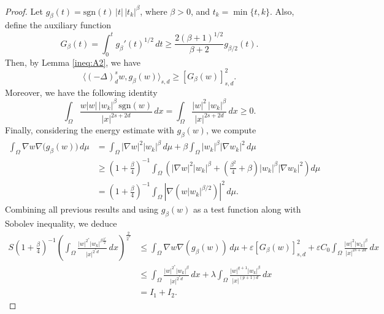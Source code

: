 \documentclass[10pt,a4paper]{amsart}
\begin{document}
\begin{proof}
Let $g_\beta(t) = \text{sgn}(t)\,|t|\,|t_k|^\beta$, where $\beta > 0$,  and $t_k = \min\{t, k\}$. Also, define the auxiliary function
\begin{equation*}
G_\beta(t) = \int_0^t g_\beta'(t)^{1/2} \, dt \geq \frac{2(\beta + 1)^{1/2}}{\beta + 2} g_{\beta/2}(t).
\end{equation*}
Then, by Lemma \ref{ineq:A2}, we have
\begin{equation*}
\langle (-\Delta)^s_d w, g_\beta(w) \rangle_{s,d} \geq \left[ G_\beta(w) \right]_{s,d}^2.
\end{equation*}
Moreover, we have the following identity
\begin{equation*}
\int_\Omega \frac{w |w|\, |w_k|^\beta \, \text{sgn}(w)}{|x|^{2s + 2 d}}\, dx = \int_\Omega \frac{|w|^2\, |w_k|^\beta}{|x|^{2s + 2 d}}\, dx \geq 0.
\end{equation*}
Finally, considering the energy estimate with \( g_\beta(w) \), we compute
\begin{equation*}
\begin{aligned}
\int_\Omega \nabla w  \nabla \big( g_\beta(w) \big)\, d\mu 
&= \int_\Omega |\nabla w|^2 |w_k|^\beta\, d\mu + \beta \int_\Omega |w_k|^\beta |\nabla w_k|^2 \, d\mu \\
&\geq \left(1 + \frac{\beta}{4}\right)^{-1} \int_\Omega \left( |\nabla w|^2 |w_k|^\beta + \left( \frac{\beta^2}{4} + \beta \right) |w_k|^\beta |\nabla w_k|^2 \right) d\mu \\
&= \left(1 + \frac{\beta}{4} \right)^{-1} \int_\Omega |\nabla (w |w_k|^{\beta/2})|^2\, d\mu.
\end{aligned}
\end{equation*}
Combining all previous results and using \( g_\beta(w) \) as a test function along with Sobolev inequality, we deduce
\begin{equation}\label{eq:moser_estimate1}
\begin{aligned}
S \left( 1 + \frac{\beta}{4} \right)^{-1}
\left( \int_\Omega \frac{|w|^{2^*} |w_k|^{\beta \frac{2^*}{2}}}{|x|^{2^* d}} \, dx \right)^{\frac{2}{2^*}}
&\leq \int_\Omega \nabla w  \nabla (g_\beta(w)) \, d\mu + \varepsilon \left[ G_\beta(w) \right]_{s,d}^2 + \varepsilon C_0\int_\Omega \frac{|w|^2 |w_k|^\beta}{|x|^{2s + 2 d}}\, dx \\
&\leq \int_\Omega \frac{|w|^{2^*} |w_k|^\beta}{|x|^{2^* d}} \, dx 
+ \lambda \int_\Omega \frac{|w|^{q+1} |w_k|^\beta}{|x|^{(p+1)d}}\, dx \\
&= I_1 + I_2.
\end{aligned}

\end{equation}
\end{proof}
\end{document}
